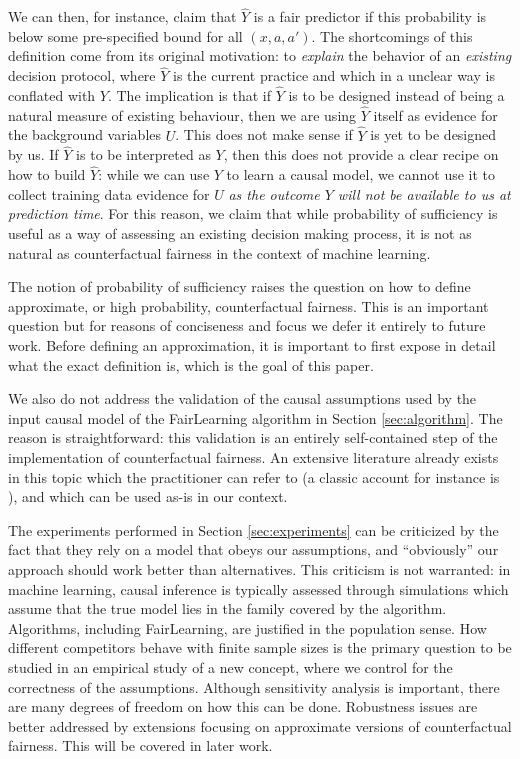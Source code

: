 We can then, for instance, claim that $\hat Y$ is a fair predictor if
this probability is below some pre-specified bound for all $(x, a,
a')$. The shortcomings of this definition come from its original
motivation: to {\it explain} the behavior of an {\it existing}
decision protocol, where $\hat Y$ is the current practice and which in a
unclear way is conflated with $Y$. The implication is that if $\hat Y$
is to be designed instead of being a natural measure of existing
behaviour, then we are using $\hat Y$ itself as evidence for the
background variables $U$. This does not make sense if $\hat Y$ is
yet to be designed by us. If $\hat Y$ is to be interpreted as $Y$, then this
does not provide a clear recipe on how to build $\hat Y$: while we can
use $Y$ to learn a causal model, we cannot use it to collect training
data evidence for $U$ {\it as the outcome $Y$ will not be available to
  us at prediction time}. For this reason, we claim that while
probability of sufficiency is useful as a way of assessing an existing
decision making process, it is not as natural as counterfactual
fairness in the context of machine learning.

 The notion
of probability of sufficiency raises the question on how to define
approximate, or high probability, counterfactual fairness. This is an
important question but for reasons of conciseness and focus we defer
it entirely to future work. Before defining an approximation, it is
important to first expose in detail what the exact definition is,
which is the goal of this paper.

We also do not address the validation of the causal assumptions used
by the input causal model of the {\sc FairLearning} algorithm in
Section \ref{sec:algorithm}. The reason is straightforward: this
validation is an entirely self-contained step of the implementation of
counterfactual fairness. An extensive literature already exists in
this topic which the practitioner can refer to (a classic account for
instance is \cite{bollen:93}), and which can be used as-is in our
context.

The experiments performed in Section \ref{sec:experiments} can be
criticized by the fact that they rely on a model that obeys our
assumptions, and ``obviously'' our approach should work better than
alternatives. This criticism is not warranted: in machine learning,
causal inference is typically assessed through simulations which
assume that the true model lies in the family covered by the
algorithm.  Algorithms, including {\sc FairLearning}, are justified in
the population sense. How different competitors behave with finite
sample sizes is the primary question to be studied in an empirical
study of a new concept, where we control for the correctness of the
assumptions. Although sensitivity analysis is important, there are
many degrees of freedom on how this can be done. Robustness issues are
better addressed by extensions focusing on approximate versions of 
counterfactual fairness. This will be covered in later work.

